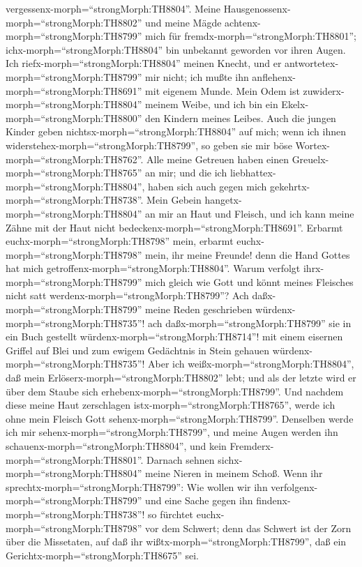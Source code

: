 vergessenx-morph=``strongMorph:TH8804''.  Meine
Hausgenossenx-morph=``strongMorph:TH8802'' und meine Mägde
achtenx-morph=``strongMorph:TH8799'' mich für
fremdx-morph=``strongMorph:TH8801''; ichx-morph=``strongMorph:TH8804''
bin unbekannt geworden vor ihren Augen.  Ich
riefx-morph=``strongMorph:TH8804'' meinen Knecht, und er
antwortetex-morph=``strongMorph:TH8799'' mir nicht; ich mußte ihn
anflehenx-morph=``strongMorph:TH8691'' mit eigenem Munde. 
Mein Odem ist zuwiderx-morph=``strongMorph:TH8804'' meinem Weibe, und
ich bin ein Ekelx-morph=``strongMorph:TH8800'' den Kindern meines
Leibes.  Auch die jungen Kinder geben
nichtsx-morph=``strongMorph:TH8804'' auf mich; wenn ich ihnen
widerstehex-morph=``strongMorph:TH8799'', so geben sie mir böse
Wortex-morph=``strongMorph:TH8762''.  Alle meine Getreuen
haben einen Greuelx-morph=``strongMorph:TH8765'' an mir; und die ich
liebhattex-morph=``strongMorph:TH8804'', haben sich auch gegen mich
gekehrtx-morph=``strongMorph:TH8738''.  Mein Gebein
hangetx-morph=``strongMorph:TH8804'' an mir an Haut und Fleisch, und ich
kann meine Zähne mit der Haut nicht
bedeckenx-morph=``strongMorph:TH8691''.  Erbarmt
euchx-morph=``strongMorph:TH8798'' mein, erbarmt
euchx-morph=``strongMorph:TH8798'' mein, ihr meine Freunde! denn die
Hand Gottes hat mich getroffenx-morph=``strongMorph:TH8804''.
 Warum verfolgt ihrx-morph=``strongMorph:TH8799'' mich
gleich wie Gott und könnt meines Fleisches nicht satt
werdenx-morph=``strongMorph:TH8799''?  Ach
daßx-morph=``strongMorph:TH8799'' meine Reden geschrieben
würdenx-morph=``strongMorph:TH8735''! ach
daßx-morph=``strongMorph:TH8799'' sie in ein Buch gestellt
würdenx-morph=``strongMorph:TH8714''!  mit einem eisernen
Griffel auf Blei und zum ewigem Gedächtnis in Stein gehauen
würdenx-morph=``strongMorph:TH8735''!  Aber ich
weißx-morph=``strongMorph:TH8804'', daß mein
Erlöserx-morph=``strongMorph:TH8802'' lebt; und als der letzte wird er
über dem Staube sich erhebenx-morph=``strongMorph:TH8799''.
 Und nachdem diese meine Haut zerschlagen
istx-morph=``strongMorph:TH8765'', werde ich ohne mein Fleisch Gott
sehenx-morph=``strongMorph:TH8799''.  Denselben werde ich
mir sehenx-morph=``strongMorph:TH8799'', und meine Augen werden ihn
schauenx-morph=``strongMorph:TH8804'', und kein
Fremderx-morph=``strongMorph:TH8801''. Darnach sehnen
sichx-morph=``strongMorph:TH8804'' meine Nieren in meinem Schoß.
 Wenn ihr sprechtx-morph=``strongMorph:TH8799'': Wie wollen
wir ihn verfolgenx-morph=``strongMorph:TH8799'' und eine Sache gegen ihn
findenx-morph=``strongMorph:TH8738''!  so fürchtet
euchx-morph=``strongMorph:TH8798'' vor dem Schwert; denn das Schwert ist
der Zorn über die Missetaten, auf daß ihr
wißtx-morph=``strongMorph:TH8799'', daß ein
Gerichtx-morph=``strongMorph:TH8675'' sei.

